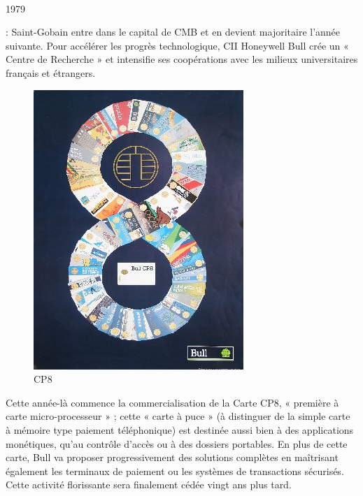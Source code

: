 \documentclass[11pt]{article}
\begin{document}
		\paragraph{}
		\begin{bf}1979\end{bf}: Saint-Gobain entre dans le capital de CMB et en devient majoritaire l’année suivante. Pour 
		accélérer les progrès technologique, CII Honeywell Bull crée un « Centre de Recherche » et intensifie ses coopérations 
		avec les milieux universitaires français et étrangers.\newline{}
		\begin{figure}
		\includegraphics[scale=0.25]{cp8_affiche_vf.jpg}
		\caption{CP8}
		\end{figure}
		Cette année-là commence la commercialisation de la Carte CP8, « première à carte micro-processeur » ; cette « carte à 
		puce » (à distinguer de la simple carte à mémoire type paiement téléphonique) est destinée aussi bien à des 
		applications monétiques, qu’au contrôle d’accès ou à des dossiers portables. En plus de cette carte, Bull va proposer 
		progressivement des solutions complètes en maîtrisant également les terminaux de paiement ou les systèmes de 
		transactions sécurisés. Cette activité florissante sera finalement cédée vingt ans plus tard.
		\newline{}
		\newline{}
		\newline{}
		\newline{}
		\newline{}
\end{document}

